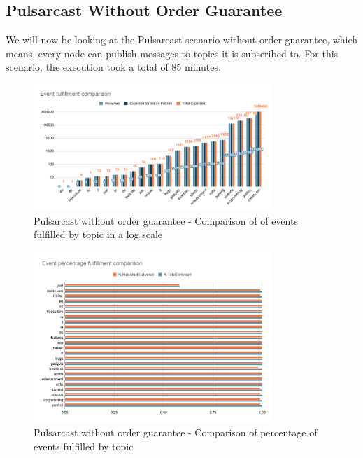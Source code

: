 \subsection{Pulsarcast Without Order Guarantee}\label{subsec:pulsarcast-without-order-guarantee}

We will now be looking at the Pulsarcast scenario without order guarantee,
which means, every node can publish messages to topics it is subscribed to. For
this scenario, the execution took a total of 85 minutes.

\begin{figure}[!htb]
  \centering
  \includegraphics[width=0.8\textwidth]{img/graph-pulsarcast-event-fulfillment-comparison.png}
  \caption{Pulsarcast without order guarantee - Comparison of of events fulfilled by topic in a log scale}
  \label{fig:graph-pulsarcast-event-fulfillment-comparison}
\end{figure}

\begin{figure}[!htb]
  \centering
  \includegraphics[width=0.8\textwidth]{img/graph-pulsarcast-event-percentage-fulfillment-comparison.png}
  \caption{Pulsarcast without order guarantee - Comparison of percentage of events fulfilled by topic}
  \label{fig:graph-pulsarcast-event-percentage-fulfillment-comparison}
\end{figure}

